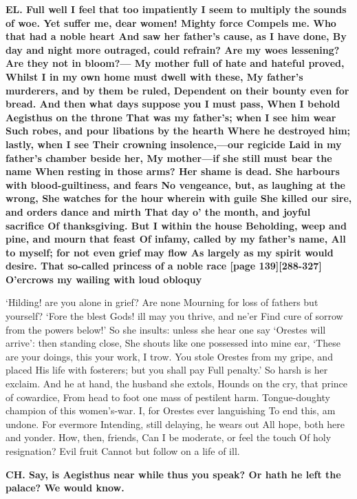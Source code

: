 \documentclass[11pt,letter]{book}
\begin{document}
\par \textbf{EL. Full well I feel that too impatiently I seem to multiply the sounds of woe. Yet suffer me, dear women! Mighty force Compels me. Who that had a noble heart And saw her father’s cause, as I have done, By day and night more outraged, could refrain? Are my woes lessening? Are they not in bloom?— My mother full of hate and hateful proved, Whilst I in my own home must dwell with these, My father’s murderers, and by them be ruled, Dependent on their bounty even for bread. And then what days suppose you I must pass, When I behold Aegisthus on the throne That was my father’s; when I see him wear Such robes, and pour libations by the hearth Where he destroyed him; lastly, when I see Their crowning insolence,—our regicide Laid in my father’s chamber beside her, My mother—if she still must bear the name When resting in those arms? Her shame is dead. She harbours with blood-guiltiness, and fears No vengeance, but, as laughing at the wrong, She watches for the hour wherein with guile She killed our sire, and orders dance and mirth That day o’ the month, and joyful sacrifice Of thanksgiving. But I within the house Beholding, weep and pine, and mourn that feast Of infamy, called by my father’s name, All to myself; for not even grief may flow As largely as my spirit would desire. That so-called princess of a noble race [page 139][288-327] O’ercrows my wailing with loud obloquy}
\par   ‘Hilding! are you alone in grief? Are none Mourning for loss of fathers but yourself? ‘Fore the blest Gods! ill may you thrive, and ne’er Find cure of sorrow from the powers below!’ So she insults:  unless she hear one say ‘Orestes will arrive’:  then standing close, She shouts like one possessed into mine ear, ‘These are your doings, this your work, I trow. You stole Orestes from my gripe, and placed His life with fosterers; but you shall pay Full penalty.’ So harsh is her exclaim. And he at hand, the husband she extols, Hounds on the cry, that prince of cowardice, From head to foot one mass of pestilent harm. Tongue-doughty champion of this women’s-war. I, for Orestes ever languishing To end this, am undone. For evermore Intending, still delaying, he wears out All hope, both here and yonder. How, then, friends, Can I be moderate, or feel the touch Of holy resignation? Evil fruit Cannot but follow on a life of ill.

\par \textbf{CH. Say, is Aegisthus near while thus you speak? Or hath he left the palace? We would know.}
\par 
\end{document}
